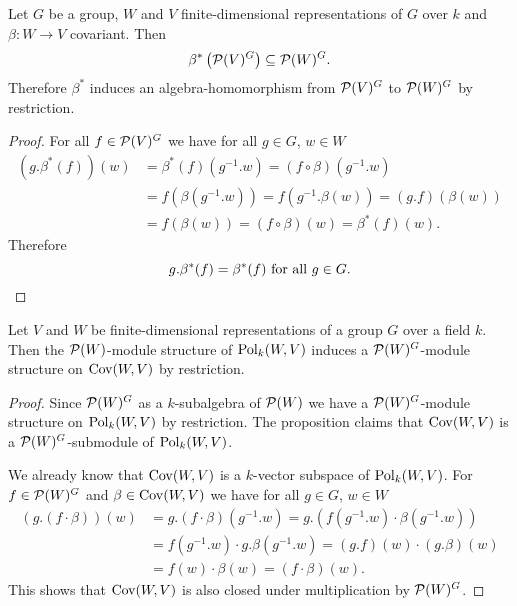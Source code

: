 \begin{prop}
  Let $G$ be a group, $W$ and $V$ finite-dimensional representations of $G$ over $k$ and $\beta \colon W \to V$ covariant.
  Then
  \[
              \beta^*\left( \mathcal{P}(V)^G \right)
    \subseteq \mathcal{P}(W)^G.
  \]
  Therefore $\beta^*$ induces an algebra-homomorphism from $\mathcal{P}(V)^G$ to $\mathcal{P}(W)^G$ by restriction.
\end{prop}
\begin{proof}
  For all $f \in \mathcal{P}(V)^G$ we have for all $g \in G$, $w \in W$
  \begin{align*}
        (g.\beta^*(f))(w)
    &=  \beta^*(f)\left( g^{-1}.w \right)
     =  (f \circ \beta)\left( g^{-1}.w \right) \\
    &=  f\left( \beta\left( g^{-1}.w \right) \right)
     =  f\left( g^{-1}.\beta(w) \right)
     =  (g.f)(\beta(w)) \\
    &=  f(\beta(w))
     =  (f \circ \beta)(w)
     =  \beta^*(f)(w).
  \end{align*}
  Therefore
  \[
      g.\beta^*(f)
    = \beta^*(f)
    \text{ for all }
    g \in G.
    \qedhere
  \]
\end{proof}


\begin{prop}
  Let $V$ and $W$ be finite-dimensional representations of a group $G$ over a field $k$.
  Then the $\mathcal{P}(W)$-module structure of $\operatorname{Pol}_k(W,V)$ induces a $\mathcal{P}(W)^G$-module structure on $\operatorname{Cov}(W,V)$ by restriction.
\end{prop}
\begin{proof}
  Since $\mathcal{P}(W)^G$ as a $k$-subalgebra of $\mathcal{P}(W)$ we have a $\mathcal{P}(W)^G$-module structure on $\operatorname{Pol}_k(W,V)$ by restriction.
  The proposition claims that $\operatorname{Cov}(W,V)$ is a $\mathcal{P}(W)^G$-submodule of $\operatorname{Pol}_k(W,V)$.
  
  We already know that $\operatorname{Cov}(W,V)$ is a $k$-vector subspace of $\operatorname{Pol}_k(W,V)$.
  For $f \in \mathcal{P}(W)^G$ and $\beta \in \operatorname{Cov}(W,V)$ we have for all $g \in G$, $w \in W$
  \begin{align*}
        (g.(f \cdot \beta))(w)
    &=  g.(f \cdot \beta)\left( g^{-1}.w \right)
     =  g.\left( f\left( g^{-1}.w \right) \cdot \beta\left( g^{-1}.w \right) \right) \\
    &=  f\left( g^{-1}.w \right) \cdot g.\beta\left( g^{-1}.w \right)
     =  (g.f)(w) \cdot (g.\beta)(w) \\
    &=  f(w) \cdot \beta(w)
     =  (f \cdot \beta)(w).
  \end{align*}
  This shows that $\operatorname{Cov}(W,V)$ is also closed under multiplication by $\mathcal{P}(W)^G$.
\end{proof}




